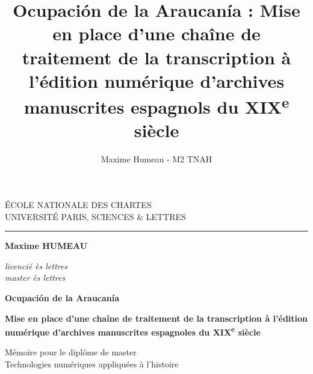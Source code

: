 \documentclass[a4paper,12pt,twoside]{book}
\author{Maxime Humeau - M2 TNAH}
\title{Ocupación de la Araucanía : Mise en place d'une chaîne de traitement de la transcription à l'édition numérique d'archives manuscrites espagnols du XIX\textsuperscript{e} siècle}
\begin{document}
	\begin{titlepage}
		\begin{center}
			
			\bigskip
			
			\begin{large}				
				ÉCOLE NATIONALE DES CHARTES\\
				UNIVERSITÉ PARIS, SCIENCES \& LETTRES
			\end{large}
			\begin{center}\rule{2cm}{0.02cm}\end{center}
			
			\bigskip
			\bigskip
			\bigskip
			\begin{Large}
				\textbf{Maxime HUMEAU}\\
			\end{Large}
			\begin{normalsize} \textit{licencié ès lettres}\\
				\textit{master ès lettres}
			\end{normalsize}
			
			\bigskip
			\bigskip
			\bigskip
			
			\begin{Huge}
				\textbf{Ocupación de la Araucanía}\\
			\end{Huge}
			\bigskip
			\bigskip
			\begin{LARGE}
				\textbf{Mise en place d'une chaîne de traitement de la transcription à l'édition numérique d'archives manuscrites espagnoles du XIX\textsuperscript{e} siècle}\\
			\end{LARGE}
			
			\bigskip
			\bigskip
			\bigskip
			\begin{large}
			\end{large}
			\vfill
			
			\begin{large}
				Mémoire 
				pour le diplôme de master \\
				\og{} Technologies numériques appliquées à l'histoire \fg{} \\
			\end{large}
			
		\end{center}
	\end{titlepage}
	
	\thispagestyle{empty}	
	\cleardoublepage
	
	\frontmatter
\end{document}
